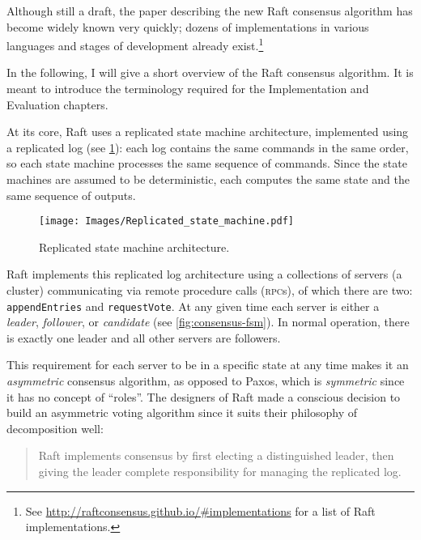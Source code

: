\documentclass[12pt,chapterprefix=true,toc=bibliography,numbers=noendperiod,
               footnotes=multiple,twoside]{scrreprt}
\begin{document}
Although still a draft, the paper describing the new Raft consensus algorithm \autocite{raft} has become widely known very quickly; dozens of implementations in various languages and stages of development already exist.\footnote{See \url{http://raftconsensus.github.io/\#implementations} for a list of Raft implementations.}

In the following, I will give a short overview of the Raft consensus algorithm. It is meant to introduce the terminology required for the Implementation and Evaluation chapters.

At its core, Raft uses a replicated state machine architecture, implemented using a replicated log (see \cref{fig:replicated-state-machine}): each log contains the same commands in the same order, so each state machine processes the same sequence of commands. Since the state machines are assumed to be deterministic, each computes the same state and the same sequence of outputs.

\begin{figure}[h]
    \centering
    \texttt{[image: Images/Replicated\_state\_machine.pdf]}
    \caption{Replicated state machine architecture.
        \protect{}
    }
    \label{fig:replicated-state-machine}
\end{figure}

Raft implements this replicated log architecture using a collections of servers (a cluster) communicating via remote procedure calls (\textsc{rpc}s), of which there are two: \texttt{appendEntries} and \texttt{requestVote}. At any given time each server is either a \emph{leader}, \emph{follower}, or \emph{candidate} (see \cref{fig:consensus-fsm}). In normal operation, there is exactly one leader and all other servers are followers.

This requirement for each server to be in a specific state at any time makes it an \emph{asymmetric} consensus algorithm, as opposed to Paxos, which is \emph{symmetric} since it has no concept of \enquote{roles}. The designers of Raft made a conscious decision to build an asymmetric voting algorithm since it suits their philosophy of decomposition well:

\begin{quote}
    Raft implements consensus by first electing a distinguished leader, then giving the leader complete responsibility for managing the replicated log.
\end{quote}
\end{document}
